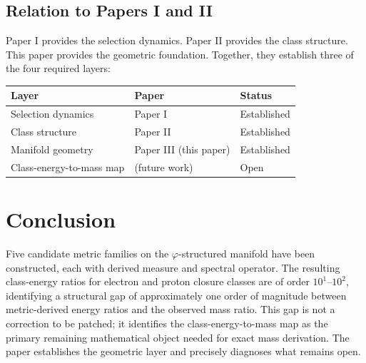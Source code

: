 \documentclass[12pt]{article}
\newcommand{\phig}{\varphi}
\begin{document}
\subsection{Relation to Papers I and II}

Paper I provides the selection dynamics. Paper II provides the class structure. This paper provides the geometric foundation. Together, they establish three of the four required layers:

\begin{table}[ht]
\centering
\begin{tabular}{@{}lll@{}}
\toprule
Layer & Paper & Status \\
\midrule
Selection dynamics & Paper I & Established \\
Class structure & Paper II & Established \\
Manifold geometry & Paper III (this paper) & Established \\
Class-energy-to-mass map & (future work) & Open \\
\bottomrule
\end{tabular}
\end{table}

\section{Conclusion}

Five candidate metric families on the $\phig$-structured manifold have been constructed, each with derived measure and spectral operator. The resulting class-energy ratios for electron and proton closure classes are of order $10^1$--$10^2$, identifying a structural gap of approximately one order of magnitude between metric-derived energy ratios and the observed mass ratio. This gap is not a correction to be patched; it identifies the class-energy-to-mass map as the primary remaining mathematical object needed for exact mass derivation. The paper establishes the geometric layer and precisely diagnoses what remains open.



\end{document}
